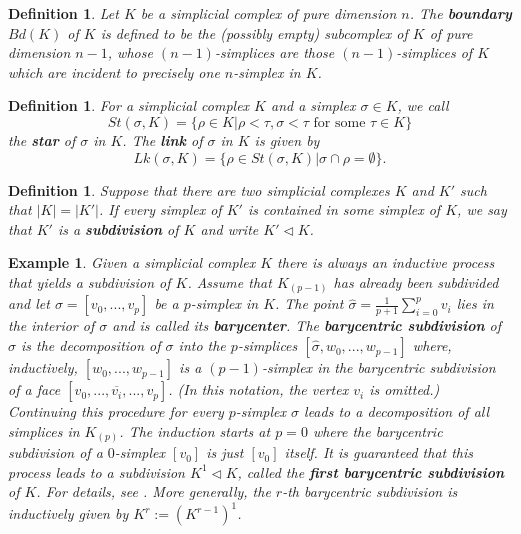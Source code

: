 \documentclass{scrreprt}
\newtheorem{definition}[prop]{Definition}
\newtheorem{example}[prop]{Example}
\begin{document}
\begin{definition}
Let $K$ be a simplicial complex of pure dimension $n$. The \textbf{boundary} $Bd(K)$ of $K$ is defined to be the (possibly empty) subcomplex of $K$ of pure dimension $n-1$, whose $(n-1)$-simplices are those $(n-1)$-simplices of $K$ which are incident to precisely one $n$-simplex in $K$.
\end{definition}

\begin{definition}
For a simplicial complex $K$ and a simplex $\sigma \in K$, we call
\begin{equation*}
St(\sigma,K)= \{ \rho \in K | \rho < \tau, \sigma < \tau \text{ for some } \tau \in K \}  
\end{equation*}
the \textbf{star} of $\sigma$ in $K$. The \textbf{link} of $\sigma$ in $K$ is given by
\begin{equation*}
Lk(\sigma,K) = \{ \rho \in St(\sigma,K) | \sigma \cap \rho = \emptyset \}.
\end{equation*}
\end{definition}

\begin{definition}
Suppose that there are two simplicial complexes $K$ and $K'$ such that $|K| = |K'|$. If every simplex of $K'$ is contained in some simplex of $K$, we say that $K'$ is a \textbf{subdivision} of $K$ and write $K' \lhd K$.
\end{definition}


\begin{example}
Given a simplicial complex $K$ there is always an inductive process that yields a subdivision of $K$. Assume that $K_{(p-1)}$ has already been subdivided and let $\sigma=[v_0,...,v_p]$ be a $p$-simplex in $K$. The point $\hat{\sigma}=\frac{1}{p+1} \sum_{i=0}^p v_i$ lies in the interior of $\sigma$ and is called its \textbf{barycenter}. The \textbf{barycentric subdivision} of $\sigma$ is the decomposition of $\sigma$ into the $p$-simplices $[\hat{\sigma},w_0,...,w_{p-1}]$ where, inductively, $[w_0,...,w_{p-1}]$ is a $(p-1)$-simplex in the barycentric subdivision of a face $[v_0,...,\overline{v_i},...,v_p]$. (In this notation, the vertex $v_i$ is omitted.) Continuing this procedure for every $p$-simplex $\sigma$ leads to a decomposition of all simplices in $K_{(p)}$. The induction starts at $p=0$ where the barycentric subdivision of a $0$-simplex $[v_0]$ is just $[v_0]$ itself. It is guaranteed that this process leads to a subdivision $K^1 \lhd K$, called the \textbf{first barycentric subdivision} of $K$. For details, see \cite{hatcher}. More generally, the $r$-th barycentric subdivision is inductively given by $K^r:=(K^{r-1})^1$.
\end{example}
\end{document}
